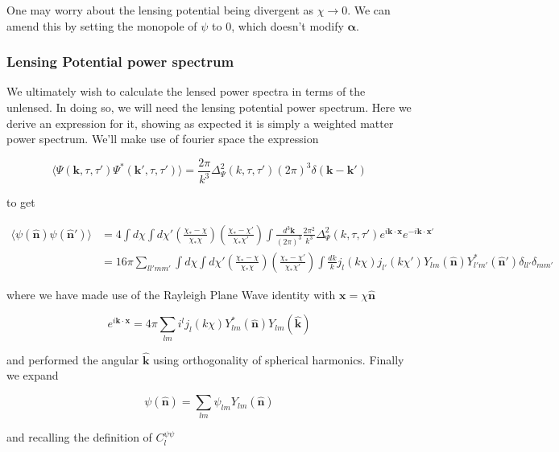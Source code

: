 \documentclass[a4paper,10pt]{article}
\renewcommand{\v}[1]{\mathbf{#1}}
\newcommand{\fint}[1]{\int \frac{d^3 \v{#1}}{(2\pi)^3}}
\newcommand{\unit}[1]{\hat{\v{#1}}}
\begin{document}
One may worry about the lensing potential being divergent as $\chi \rightarrow 0$. We can amend this by setting the monopole of $\psi$ to 0, which doesn't modify $\v{\alpha}$. 

\subsubsection{Lensing Potential power spectrum}

We ultimately wish to calculate the lensed power spectra in terms of the unlensed. In doing so, we will need the lensing potential power spectrum. Here we derive an expression for it, showing as expected it is simply a weighted matter power spectrum. We'll make use of fourier space the expression

\begin{equation}
\langle \Psi(\v{k},\tau,\tau')\Psi^*(\v{k}',\tau,\tau')\rangle=\frac{2\pi}{k^3}\Delta^2_\Psi(k,\tau,\tau')(2\pi)^3\delta(\v{k}-\v{k}')
\end{equation}

to get 

\begin{equation}\begin{split}
\langle \psi(\unit{n})\psi(\unit{n}') \rangle &= 4\int d\chi \int d\chi'(\frac{\chi_*-\chi}{\chi_*\chi})(\frac{\chi_*-\chi'}{\chi_*\chi'})\fint{k}\frac{2\pi^2}{k^3}\Delta^2_\Psi(k,\tau,\tau')e^{i\v{k}\cdot\v{x}}e^{-i\v{k}\cdot\v{x'}}\\
&= 16\pi \sum_{ll'mm'}\int d\chi \int d\chi'(\frac{\chi_*-\chi}{\chi_*\chi})(\frac{\chi_*-\chi'}{\chi_*\chi'})\int \frac{dk}{k}j_l(k\chi)j_{l'}(k\chi')Y_{lm}(\unit{n})Y^*_{l'm'}(\unit{n}')\delta_{ll'}\delta_{mm'}
\end{split}\end{equation}

where we have made use of the Rayleigh Plane Wave identity with $\v{x}=\chi\unit{n}$

\begin{equation}
e^{i\v{k}\cdot\v{x}} = 4\pi\sum_{lm}i^lj_l(k\chi)Y_{lm}^*(\unit{n})Y_{lm}(\unit{k})
\end{equation}

and performed the angular $\unit{k}$ using orthogonality of spherical harmonics. Finally we expand

\begin{equation}
\psi(\unit{n}) = \sum_{lm}\psi_{lm}Y_{lm}(\unit{n})
\end{equation}

and recalling the definition of $C_l^{\psi\psi}$
\end{document}

